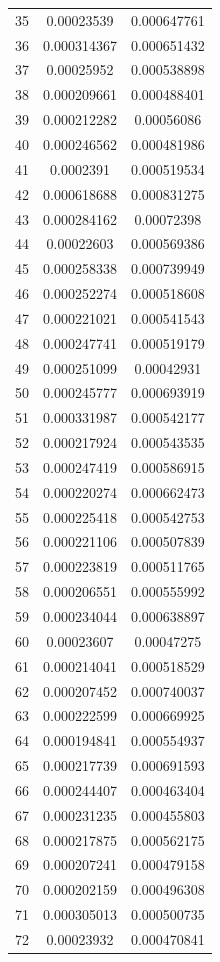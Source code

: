 \documentclass{jreport}		%
\begin{document}
\begin{table}
\begin{tabular}{c|cc}
35&0.00023539&0.000647761 \\
36&0.000314367&0.000651432 \\
37&0.00025952&0.000538898 \\
38&0.000209661&0.000488401 \\
39&0.000212282&0.00056086 \\
40&0.000246562&0.000481986 \\
41&0.0002391&0.000519534 \\
42&0.000618688&0.000831275 \\
43&0.000284162&0.00072398 \\
44&0.00022603&0.000569386 \\
45&0.000258338&0.000739949 \\
46&0.000252274&0.000518608 \\
47&0.000221021&0.000541543 \\
48&0.000247741&0.000519179 \\
49&0.000251099&0.00042931 \\
50&0.000245777&0.000693919 \\
51&0.000331987&0.000542177 \\
52&0.000217924&0.000543535 \\
53&0.000247419&0.000586915 \\
54&0.000220274&0.000662473 \\
55&0.000225418&0.000542753 \\
56&0.000221106&0.000507839 \\
57&0.000223819&0.000511765 \\
58&0.000206551&0.000555992 \\
59&0.000234044&0.000638897 \\
60&0.00023607&0.00047275 \\
61&0.000214041&0.000518529 \\
62&0.000207452&0.000740037 \\
63&0.000222599&0.000669925 \\
64&0.000194841&0.000554937 \\
65&0.000217739&0.000691593 \\
66&0.000244407&0.000463404 \\
67&0.000231235&0.000455803 \\
68&0.000217875&0.000562175 \\
69&0.000207241&0.000479158 \\
70&0.000202159&0.000496308 \\
71&0.000305013&0.000500735 \\
72&0.00023932&0.000470841 \\

\end{tabular}
\end{table}
\end{document}
